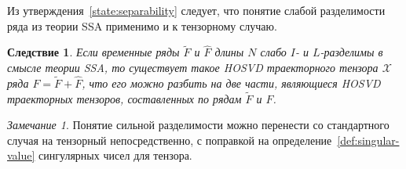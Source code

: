 \documentclass[specialist,
    substylefile = spbu_report.rtx,
    subf,href,colorlinks=true, 12pt]{disser}
\theoremstyle{plain}
\newtheorem{corollary}{Следствие}[statement]
\theoremstyle{definition}
\theoremstyle{remark}
\newtheorem*{remark}{Замечание}
\begin{document}
    Из утверждения~\ref{state:separability} следует, что понятие слабой разделимости ряда из теории SSA
    применимо и к тензорному случаю.
    \begin{corollary}
        Если временные ряды $\tilde{F}$ и $\hat{F}$ длины $N$ слабо $I$- и $L$-разделимы в смысле теории \emph{SSA},
        то существует такое \emph{HOSVD} траекторного тензора $\mathcal{X}$ ряда $F=\tilde{F} + \hat{F}$, что его можно разбить
        на две части, являющиеся \emph{HOSVD} траекторных тензоров, составленных по рядам $\tilde{F}$ и $\hat{F}$.
    \end{corollary}
    \begin{remark}
        Понятие сильной разделимости можно перенести со стандартного случая на тензорный непосредственно, с поправкой на
        определение~\ref{def:singular-value} сингулярных чисел для тензора.
    \end{remark}
\end{document}
